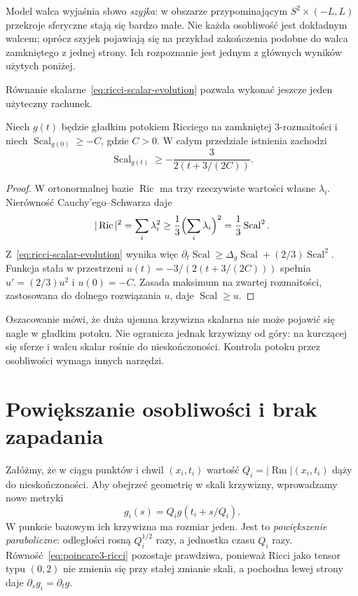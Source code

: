 Model walca wyjaśnia słowo \emph{szyjka}:
w obszarze przypominającym $S^2\times(-L,L)$
przekroje sferyczne stają się bardzo małe.
Nie każda osobliwość jest dokładnym walcem;
oprócz szyjek pojawiają się na przykład
zakończenia podobne do walca zamkniętego
z jednej strony. Ich rozpoznanie jest jednym
z głównych wyników użytych poniżej.

Równanie skalarne~\eqref{eq:ricci-scalar-evolution}
pozwala wykonać jeszcze jeden użyteczny rachunek.

\begin{stwierdzenie}
\label{prop:poincare3-skalar-dol}
Niech $g(t)$ będzie gładkim potokiem Ricciego
na zamkniętej $3$-rozmaitości i niech
$\operatorname{Scal}_{g(0)}\geq-C$, gdzie $C>0$.
W całym przedziale istnienia zachodzi
\begin{equation}\label{eq:poincare3-skalar-dol}
 \operatorname{Scal}_{g(t)}
 \geq-\frac{3}{2(t+3/(2C))}.
\end{equation}
\end{stwierdzenie}
\begin{proof}
W ortonormalnej bazie $\operatorname{Ric}$ ma trzy
rzeczywiste wartości własne $\lambda_i$. Nierówność
Cauchy'ego--Schwarza daje
\[
 |\operatorname{Ric}|^2=\sum_i\lambda_i^2
 \geq\frac13\Bigl(\sum_i\lambda_i\Bigr)^2
 =\frac13\operatorname{Scal}^2.
\]
Z~\eqref{eq:ricci-scalar-evolution} wynika więc
$\partial_t\operatorname{Scal}
 \geq\Delta_g\operatorname{Scal}
 +(2/3)\operatorname{Scal}^2$.
Funkcja stała w przestrzeni
$u(t)=-3/(2(t+3/(2C)))$ spełnia
$u'=(2/3)u^2$ i $u(0)=-C$.
Zasada maksimum na zwartej rozmaitości,
zastosowana do dolnego rozwiązania $u$,
daje $\operatorname{Scal}\geq u$.
\end{proof}

Oszacowanie mówi, że duża ujemna krzywizna
skalarna nie może pojawić się nagle w gładkim
potoku. Nie ogranicza jednak krzywizny od góry:
na kurczącej się sferze i walcu skalar rośnie
do nieskończoności. Kontrola potoku przez
osobliwości wymaga innych narzędzi.

\section{Powiększanie osobliwości i brak zapadania}
\label{sec:poincare3-osobliwosci}

Załóżmy, że w ciągu punktów i chwil $(x_i,t_i)$
wartość $Q_i=|\operatorname{Rm}|(x_i,t_i)$
dąży do nieskończoności. Aby obejrzeć geometrię
w skali krzywizny, wprowadzamy nowe metryki
\begin{equation}\label{eq:poincare3-rescale}
 g_i(s)=Q_i g(t_i+s/Q_i).
\end{equation}
W punkcie bazowym ich krzywizna ma rozmiar jeden.
Jest to \emph{powiększenie paraboliczne}:
odległości rosną $Q_i^{1/2}$ razy, a jednostka
czasu $Q_i$ razy. Równość~\eqref{eq:poincare3-ricci}
pozostaje prawdziwa, ponieważ Ricci jako tensor
typu $(0,2)$ nie zmienia się przy stałej zmianie
skali, a pochodna lewej strony daje
$\partial_sg_i=\partial_tg$.


